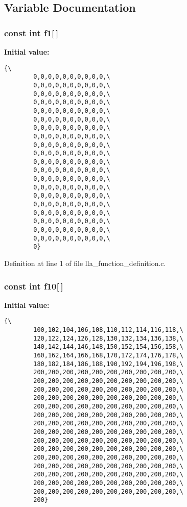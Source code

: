 \subsection{Variable Documentation}
\subsubsection{\setlength{\rightskip}{0pt plus 5cm}const int {\bf f1}[$\,$]}\label{lla__function__definition_8c_a0}


{\bf Initial value:}

\footnotesize\begin{verbatim}{\
        0,0,0,0,0,0,0,0,0,0,\
        0,0,0,0,0,0,0,0,0,0,\
        0,0,0,0,0,0,0,0,0,0,\
        0,0,0,0,0,0,0,0,0,0,\
        0,0,0,0,0,0,0,0,0,0,\
        0,0,0,0,0,0,0,0,0,0,\
        0,0,0,0,0,0,0,0,0,0,\
        0,0,0,0,0,0,0,0,0,0,\
        0,0,0,0,0,0,0,0,0,0,\
        0,0,0,0,0,0,0,0,0,0,\
        0,0,0,0,0,0,0,0,0,0,\
        0,0,0,0,0,0,0,0,0,0,\
        0,0,0,0,0,0,0,0,0,0,\
        0,0,0,0,0,0,0,0,0,0,\
        0,0,0,0,0,0,0,0,0,0,\
        0,0,0,0,0,0,0,0,0,0,\
        0,0,0,0,0,0,0,0,0,0,\
        0,0,0,0,0,0,0,0,0,0,\
        0,0,0,0,0,0,0,0,0,0,\
        0,0,0,0,0,0,0,0,0,0,\
        0}
\end{verbatim}\normalsize 


Definition at line 1 of file lla\_\-function\_\-definition.c.
\subsubsection{\setlength{\rightskip}{0pt plus 5cm}const int {\bf f10}[$\,$]}\label{lla__function__definition_8c_a9}


{\bf Initial value:}

\footnotesize\begin{verbatim}{\
        100,102,104,106,108,110,112,114,116,118,\
        120,122,124,126,128,130,132,134,136,138,\
        140,142,144,146,148,150,152,154,156,158,\
        160,162,164,166,168,170,172,174,176,178,\
        180,182,184,186,188,190,192,194,196,198,\
        200,200,200,200,200,200,200,200,200,200,\
        200,200,200,200,200,200,200,200,200,200,\
        200,200,200,200,200,200,200,200,200,200,\
        200,200,200,200,200,200,200,200,200,200,\
        200,200,200,200,200,200,200,200,200,200,\
        200,200,200,200,200,200,200,200,200,200,\
        200,200,200,200,200,200,200,200,200,200,\
        200,200,200,200,200,200,200,200,200,200,\
        200,200,200,200,200,200,200,200,200,200,\
        200,200,200,200,200,200,200,200,200,200,\
        200,200,200,200,200,200,200,200,200,200,\
        200,200,200,200,200,200,200,200,200,200,\
        200,200,200,200,200,200,200,200,200,200,\
        200,200,200,200,200,200,200,200,200,200,\
        200,200,200,200,200,200,200,200,200,200,\
        200}
\end{verbatim}\normalsize 



